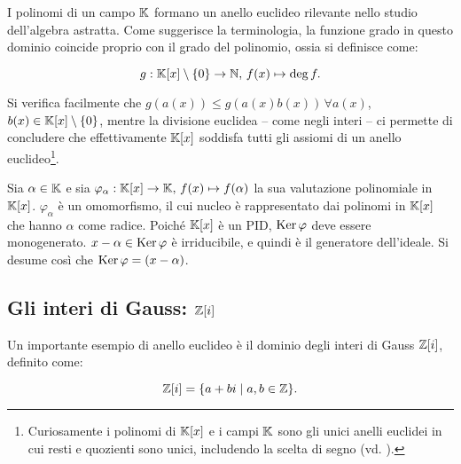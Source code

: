 I polinomi di un campo $\mathbb{K}$ formano un anello euclideo rilevante
nello studio dell'algebra astratta. Come suggerisce la
terminologia, la funzione grado in questo dominio coincide
proprio con il grado del polinomio, ossia si definisce come:

\[g : \mathbb{K}[x] \setminus \{0\} \to \mathbb N, \, f(x) \mapsto \deg f.\]

\vskip 0.1in

Si verifica facilmente che $g(a(x)) \leq g(a(x)b(x)) \, \forall a(x)$, $b(x) \in \mathbb{K}[x] \setminus \{0\}$, mentre la divisione euclidea -- come negli interi -- ci permette
di concludere che effettivamente $\mathbb{K}[x]$ soddisfa tutti gli assiomi di un anello
euclideo\footnote{Curiosamente i polinomi di $\mathbb{K}[x]$ e i campi $\mathbb{K}$ sono gli unici anelli euclidei in cui resti
    e quozienti sono unici, includendo la scelta di segno (vd.
    \cite{10.2307/2315810}).}.

\begin{example}
    Sia $\alpha \in \mathbb{K}$ e sia $\varphi_\alpha : \mathbb{K}[x] \to \mathbb{K}, \, f(x) \mapsto f(\alpha)$
    la sua valutazione polinomiale in $\mathbb{K}[x]$. $\varphi_\alpha$ è un omomorfismo, il cui
    nucleo è rappresentato dai polinomi in $\mathbb{K}[x]$ che hanno $\alpha$ come radice. Poiché
    $\mathbb{K}[x]$ è un PID, $\operatorname{Ker} \varphi$ deve essere monogenerato. $x-\alpha \in \operatorname{Ker} \varphi$
    è irriducibile, e quindi è il generatore dell'ideale. Si desume così che
    $\operatorname{Ker} \varphi = (x-\alpha)$.
\end{example}

\subsection{Gli interi di Gauss: $\mathbb Z[i]$}

Un importante esempio di anello euclideo è il dominio degli interi di Gauss $\mathbb Z[i]$, definito come:

\[\mathbb Z[i] = \{a+bi \mid a, b \in \mathbb Z\}.\]

\vskip 0.1in

